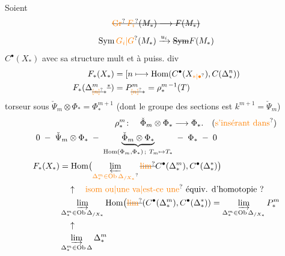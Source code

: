 Soient 
\[
 \deleted{\unsure{\mathrm{Gr}}\,\unsure{F_i}(M_*)\longrightarrow F(M_*)}
\]
\[
 \operatorname{Sym}\unsure{G_i|G}(M_*)\xrightarrow{u_i}\deleted{\operatorname{Sym}}F(M_*)
\]
 \(C^\bullet(X_*)\) avec sa structure mult et à puiss. div
\[
\begin{aligned}
 F_*(X_*)&=[n\longmapsto\operatorname{Hom}(C^\bullet(X_{\unsure{*|\bullet}}),C(\Delta^n_*))\\
 F_*(\Delta^{m}_{{\deleted{\unsure{[n]}}}*}\deleted{{}^{*}})
 &=P^m_{\deleted{\unsure{[n]}}*}=\rho_*^{m\,-1}(T)
\end{aligned}
\]
torseur sous \(\check\Psi_m\otimes\Phi_*=\Phi_*^{m+1}\)
(dont le groupe des sections est \(k^{m+1}=\check\Psi_m\))
\[
\begin{aligned}
 \rho^m_*\colon\quad\check{\Phi}_m\otimes\Phi_*&\longrightarrow\Phi_*.
 \quad\text{(\unsure{s'insérant dans})}\\
 0\;-\;\check\Psi_m\otimes\Phi_* \;-\;
 \underbrace{\check{\Phi}_m\otimes\Phi_*}_{
 \operatorname{Hom}(\Phi_m,\Phi_*)\,;\ T_m\mapsto T_*}
 &\;-\;\Phi_*\;-\;0
\end{aligned}
\]
\[
 \begin{aligned}
 F_*(X_*)&=\operatorname{Hom}\bigl(\varprojlim_{\unsure{\Delta^m_*\in\mathrm{Ob}\,\Delta_{/X_*}}}
 \deleted{\unsure{\lim}} C^\bullet(\Delta^m_*),C^\bullet(\Delta^*_* )\bigr)\\
 &\hspace{1em}\uparrow\quad\text{\unsure{isom ou|une va|est-ce une} équiv. d'homotopie ?}\\
 &\varinjlim_{\Delta^m_*\in\mathrm{Ob}\,\Delta_{/X_*}}\operatorname{Hom}
 \bigl(\deleted{\unsure{\lim}}(C^\bullet(\Delta^m_*),C^\bullet(\Delta^*_*))=
 \varinjlim_{\Delta^m_*\in\mathrm{Ob}\,\Delta_{/X_*}}P^m_*\\
 &\hspace{1em}\uparrow\\
 &\varinjlim_{\Delta^m_*\in\mathrm{Ob}\,\Delta}\Delta^m_*
 \end{aligned}
\]
